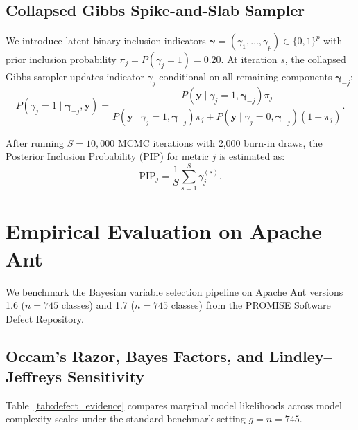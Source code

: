 \documentclass[11pt,a4paper]{article}
\begin{document}
\subsection{Collapsed Gibbs Spike-and-Slab Sampler}
We introduce latent binary inclusion indicators $\boldsymbol{\gamma} = (\gamma_1, \dots, \gamma_p) \in \{0, 1\}^p$ with prior inclusion probability $\pi_j = P(\gamma_j = 1) = 0.20$.
At iteration $s$, the collapsed Gibbs sampler updates indicator $\gamma_j$ conditional on all remaining components $\boldsymbol{\gamma}_{-j}$:
\begin{equation}
P(\gamma_j = 1 \mid \boldsymbol{\gamma}_{-j}, \mathbf{y}) = \frac{P(\mathbf{y} \mid \gamma_j=1, \boldsymbol{\gamma}_{-j}) \pi_j}{P(\mathbf{y} \mid \gamma_j=1, \boldsymbol{\gamma}_{-j}) \pi_j + P(\mathbf{y} \mid \gamma_j=0, \boldsymbol{\gamma}_{-j}) (1 - \pi_j)}.
\end{equation}

After running $S = 10,000$ MCMC iterations with 2,000 burn-in draws, the Posterior Inclusion Probability (PIP) for metric $j$ is estimated as:
\begin{equation}
\text{PIP}_j = \frac{1}{S}\sum_{s=1}^S \gamma_j^{(s)}.
\end{equation}

\section{Empirical Evaluation on Apache Ant}

We benchmark the Bayesian variable selection pipeline on Apache Ant versions 1.6 ($n = 745$ classes) and 1.7 ($n = 745$ classes) from the PROMISE Software Defect Repository.

\subsection{Occam's Razor, Bayes Factors, and Lindley--Jeffreys Sensitivity}
Table~\ref{tab:defect_evidence} compares marginal model likelihoods across model complexity scales under the standard benchmark setting $g = n = 745$.

\begin{table}[H]
\centering
\caption{Model evidence and Bayes factors across complexity specifications (Ant 1.6, $g = n$).}
\label{tab:defect_evidence}
\end{table}
\end{document}
